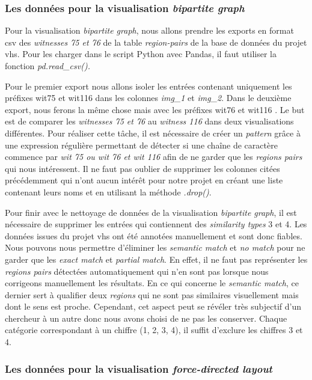 \subsubsection{Les données pour la visualisation \textit{bipartite graph}}

Pour la visualisation \textit{bipartite graph}, nous allons prendre les exports en format \gls{csv} des \textit{witnesses 75 et 76} de la table \textit{region-pairs} de la base de données du projet \gls{vhs}. Pour les charger dans le script Python avec Pandas, il faut utiliser la fonction \textit{pd.read\_csv().}

Pour le premier export nous allons isoler les entrées contenant uniquement les préfixes \og wit75 \fg et \og wit116 \fg dans les colonnes \textit{img\_1} et \textit{img\_2}. Dans le deuxième export, nous ferons la même chose mais avec les préfixes \og wit76 \fg et \og wit116 \fg. Le but est de comparer les \textit{witnesses 75 et 76} au \textit{witness 116} dans deux visualisations différentes. Pour réaliser cette tâche, il est nécessaire de créer un \textit{pattern} grâce à une expression régulière permettant de détecter si une chaîne de caractère commence par \textit{wit 75 ou wit 76 et wit 116} afin de ne garder que les \textit{regions pairs} qui nous intéressent. Il ne faut pas oublier de supprimer les colonnes citées précédemment qui n'ont aucun intérêt pour notre projet en créant une liste contenant leurs noms et en utilisant la méthode \textit{.drop()}.

Pour finir avec le nettoyage de données de la visualisation \textit{bipartite graph}, il est nécessaire de supprimer les entrées qui contiennent des \textit{similarity types} 3 et 4. Les données issues du projet \gls{vhs} ont été annotées manuellement et sont donc fiables. Nous pouvons nous permettre d'éliminer les \textit{semantic match} et \textit{no match} pour ne garder que les \textit{exact match} et \textit{partial match}. En effet, il ne faut pas représenter les \textit{regions pairs} détectées automatiquement qui n'en sont pas lorsque nous corrigeons manuellement les résultats. En ce qui concerne le \textit{semantic match}, ce dernier sert à qualifier deux \textit{regions} qui ne sont pas similaires visuellement mais dont le sens est proche. 
Cependant, cet aspect peut se révéler très subjectif d'un chercheur à un autre donc nous avons choisi de ne pas les conserver. Chaque catégorie correspondant à un chiffre (1, 2, 3, 4), il suffit d'exclure les chiffres 3 et 4. 


\subsubsection{Les données pour la visualisation \textit{force-directed layout}}

